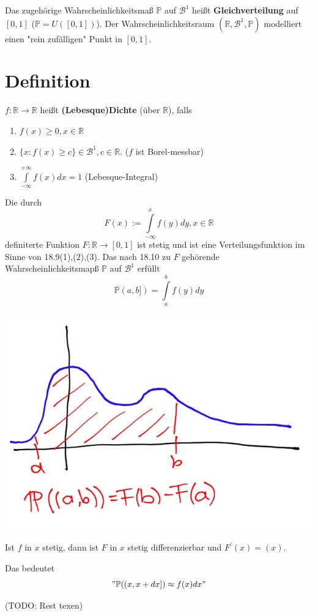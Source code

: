 \documentclass[a4paper,11pt,notitlepage]{report}
\newcommand{\R}{{\ensuremath{\mathbb{R}}}}
\newcommand{\Prim}{{\ensuremath{\mathbb{P}}}}
\begin{document}
Das zugehörige Wahrscheinlichkeitsmaß $\Prim$ auf $\mathcal{B}^1$ heißt \textbf{Gleichverteilung} auf $[0,1]$ ($\Prim = U([0,1])$). Der Wahrscheinlichkeitsraum
$(\R, \mathcal{B}^1, \Prim)$ modelliert einen "rein zufälligen" Punkt in $[0,1]$.

\section{Definition}
$f \colon \R \rightarrow \R$ heißt \textbf{(Lebesque)Dichte} (über $\R$), falls
\begin{enumerate}
	\item $f(x) \geq 0, x \in \R$
	\item $\{x \colon f(x) \geq c\} \in \mathcal{B}^1, c \in \R$. ($f$ ist Borel-messbar)
	 \item $\int\limits_{- \infty}^{+ \infty}{f(x) dx} = 1$ (Lebesque-Integral)
\end{enumerate}
Die durch 
$$F(x) := \int\limits_{- \infty}^{x}{f(y) dy}, x \in \R$$
definiterte Funktion $F \colon \R \rightarrow [0,1]$ ist stetig und ist eine Verteilungsfunktion im Sinne von 18.9(1),(2),(3). Das nach 18.10 zu $F$ gehörende Wahrscheinlichkeitsmapß $\Prim$ auf $\mathcal{B}^1$ erfüllt
$$\Prim(a,b]) = \int\limits_{a}^{b}{f(y)dy}$$
\begin{center}
	\includegraphics[scale=0.4]{bild4.jpg}
\end{center}
Ist $f$ in $x$ stetig, dann ist $F$ in $x$ stetig differenzierbar und $F^\prime(x) = (x)$.

Das bedeutet 
$$"\Prim((x, x+dx]) \approx f(x) dx"$$

(TODO: Rest texen)
\end{document}
